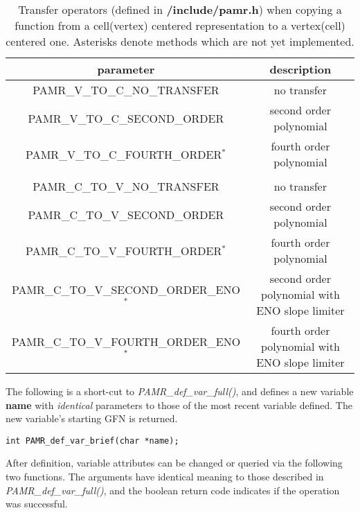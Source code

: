 \documentclass[aps,amssymb,unsortedaddress,nofootinbib]{revtex4}
\begin{document}
\begin{table}[t]
\begin{center}
\begin{tabular}[t]{| c || c |}
\hline
parameter & description \\
\hline
\hline
PAMR\_V\_TO\_C\_NO\_TRANSFER     & no transfer \\
PAMR\_V\_TO\_C\_SECOND\_ORDER    & second order polynomial \\
PAMR\_V\_TO\_C\_FOURTH\_ORDER${}^*$   & fourth order polynomial \\
& \\
PAMR\_C\_TO\_V\_NO\_TRANSFER     & no transfer \\
PAMR\_C\_TO\_V\_SECOND\_ORDER    & second order polynomial \\
PAMR\_C\_TO\_V\_FOURTH\_ORDER${}^*$    & fourth order polynomial \\
PAMR\_C\_TO\_V\_SECOND\_ORDER\_ENO${}^*$ & second order polynomial with ENO slope limiter \\
PAMR\_C\_TO\_V\_FOURTH\_ORDER\_ENO${}^*$ & fourth order polynomial with ENO slope limiter \\
\hline
\end{tabular}
\end{center}
\caption
{Transfer operators (defined in {\bf /include/pamr.h}) when copying
a function from a cell(vertex) centered representation to a vertex(cell) 
centered one. Asterisks denote methods which are not yet implemented.
\label{cv_trans_ops}}
\end{table}


\noindent 
The following is a short-cut to {\em PAMR\_def\_var\_full()}, and defines a new
variable {\bf name} with {\em identical} parameters to those of the
most recent variable defined. The new variable's starting GFN is returned.

\begin{verbatim}
int PAMR_def_var_brief(char *name);
\end{verbatim}


\noindent
After definition, variable attributes can be changed or queried via the following
two functions. The arguments have identical meaning to those described in 
{\em PAMR\_def\_var\_full()}, and the boolean return code indicates if the operation 
was successful.
\end{document}

